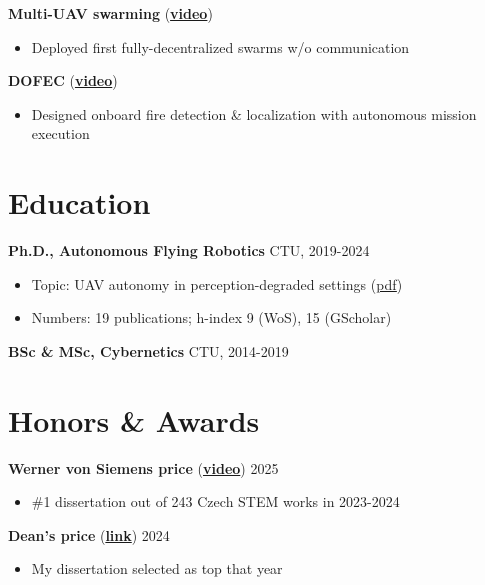 \documentclass[12pt,a4paper]{article}
\newcommand\Colorhref[3][ref]{\href{#2}{\color{#1}#3}}
\newcommand\Colorhreff[3][reff]{\href{#2}{\color{#1}#3}}
\begin{document}
\begin{paracol}{2}
\vspace{0.2cm}
\noindent
\textbf{Multi-UAV swarming} (\Colorhreff{https://www.youtube.com/watch?v=Ax3ONfo1hMA}{\textbf{video}})
\begin{itemize}
    \item Deployed first fully-decentralized swarms w/o communication
\end{itemize}

\vspace{0.2cm}
\noindent
\textbf{DOFEC} (\Colorhreff{https://www.youtube.com/watch?v=QHpifXJzH5g}{\textbf{video}})
\begin{itemize}
    \item Designed onboard fire detection \& localization with autonomous mission execution
\end{itemize}

\section*{Education}
\textbf{Ph.D., Autonomous Flying Robotics} \hfill CTU, 2019-2024
\begin{itemize}
  \item Topic: UAV autonomy in perception-degraded settings (\Colorhreff{https://mrs.fel.cvut.cz/data/papers/petracek_phd_thesis.pdf}{pdf})
  \item Numbers: 19 publications; h-index 9 (WoS), 15 (GScholar)
\end{itemize}

\noindent
\textbf{BSc \& MSc, Cybernetics} \hfill CTU, 2014-2019

\section*{Honors \& Awards}
\textbf{Werner von Siemens price} (\Colorhref{https://www.youtube.com/watch?v=idnDA4Ap-J4}{\textbf{video}}) \hfill 2025
\begin{itemize}
  \item \#1 dissertation out of 243 Czech STEM works in 2023-2024
\end{itemize}

\vspace{0.2cm}
\noindent
\textbf{Dean's price} (\Colorhref{https://cyber.felk.cvut.cz/news/pavel-petracek-received-the-deans-award-for-prestigious-dissertation/}{\textbf{link}}) \hfill 2024
\begin{itemize}
  \item My dissertation selected as top that year
\end{itemize}


\end{paracol}
\end{document}
